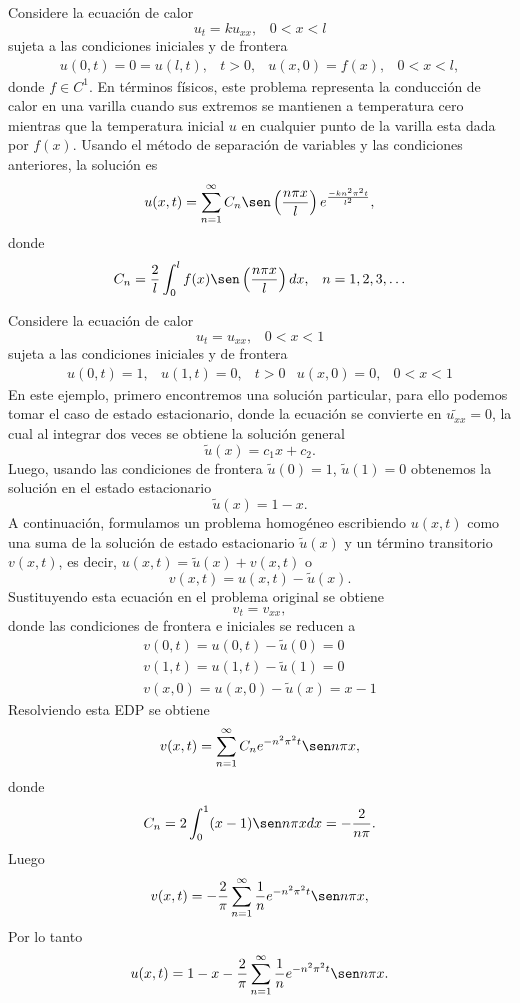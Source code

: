\begin{Ejem}
	Considere la ecuación de calor 
	$$u_t=ku_{xx},\;\;\; 0<x<l$$
	sujeta a las condiciones iniciales y de frontera
	\[
	\begin{array}{cccc}
		u(0,t)=0=u(l,t),& t>0,&u(x,0)=f(x),&0<x<l,
	\end{array}
	\]
	donde $f\in C^{1}$. En términos físicos, este problema representa la conducción de calor en una varilla cuando sus extremos se mantienen a temperatura cero mientras que la temperatura inicial $u$ en cualquier punto de la varilla esta dada por $f(x)$. Usando el método de separación de variables y las condiciones anteriores, la solución es
	$$u(x,t)=\sum_{n=1}^{\infty}C_n\sen \left(\dfrac{n\pi x}{l}\right)e^{\frac{-kn^2 \pi^2 t}{l^2}},$$
	donde $$C_n=\dfrac{2}{l}\int_{0}^{l}f(x)\sen\left(\dfrac{n\pi x}{l}\right)dx,\;\;\;n=1,2,3,\ldots$$\endproof
\end{Ejem}
\begin{Ejem}
	Considere la ecuación de calor 
	$$u_t=u_{xx},\;\;\; 0<x<1$$
	sujeta a las condiciones iniciales y de frontera
	\[
	\begin{array}{ccccc}
		u(0,t)=1,&u(1,t)=0,&t>0& u(x,0)=0,&0<x<1
	\end{array}
	\]
	En este ejemplo, primero encontremos una solución particular, para ello podemos tomar el caso de estado estacionario, donde la ecuación se convierte en $\tilde{u_{xx}}=0$, la cual al integrar dos veces se obtiene la solución general
	$$\tilde{u}(x)=c_1x+c_2.$$
	Luego, usando las condiciones de frontera $\tilde{u}(0)=1$, $\tilde{u}(1)=0$ obtenemos la solución en el estado estacionario $$\tilde{u}(x)=1-x.$$
	A continuación, formulamos un problema homogéneo escribiendo $u(x, t)$ como una suma de la solución de estado estacionario $\tilde{u}(x)$ y un término transitorio $v(x,t)$, es decir, $u(x,t)=\tilde{u}(x)+v(x,t)$ o 
	$$v(x,t)=u(x,t)-\tilde{u}(x).$$
	Sustituyendo esta ecuación en el problema original se obtiene 
	$$v_t=v_{xx},$$
	donde las condiciones de frontera e iniciales se reducen a 
	\[
	\begin{array}{c}
		v(0,t)=u(0,t)-\tilde{u}(0)=0\\
		v(1,t)=u(1,t)-\tilde{u}(1)=0\\
		v(x,0)=u(x,0)-\tilde{u}(x)=x-1
	\end{array}
	\]
	Resolviendo esta EDP se obtiene 
	$$v(x,t)=\sum_{n=1}^{\infty}C_ne^{-n^2\pi^2t}\sen n\pi x,$$
	donde $$C_n=2\int_{0}^{1}(x-1)\sen n\pi x dx=-\dfrac{2}{n\pi}.$$
	Luego $$v(x,t)=-\dfrac{2}{\pi}\sum_{n=1}^{\infty}\dfrac{1}{n}e^{-n^2\pi^2t}\sen n\pi x,$$
	Por lo tanto 
	$$u(x,t)=1-x-\dfrac{2}{\pi}\sum_{n=1}^{\infty}\dfrac{1}{n}e^{-n^2\pi^2t}\sen n\pi x.$$\endproof
\end{Ejem}
